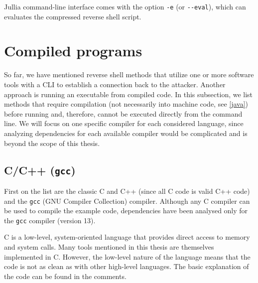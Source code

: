 
Jullia command-line interface comes with the option \texttt{-e} (or \texttt{-{}-eval}), which can evaluates the compressed reverse shell script.


\section{Compiled programs}
\label{program-compilers}

So far, we have mentioned reverse shell methods that utilize one or more software tools with a CLI to establish a connection back to the attacker. Another approach is running an executable from compiled code. In this subsection, we list methods that require compilation (not necessarily into machine code, see \cref{java}) before running and, therefore, cannot be executed directly from the command line. We will focus on one specific compiler for each considered language, since analyzing dependencies for each available compiler would be complicated and is beyond the scope of this thesis.

\subsection{C/C++ (\texttt{gcc})}


First on the list are the classic C and C++ (since all C code is valid C++ code) and the \texttt{gcc} (GNU Compiler Collection) compiler. Although any C compiler can be used to compile the example code, dependencies have been analysed only for the \texttt{gcc} compiler (version 13).

C is a low-level, system-oriented language that provides direct access to memory and system calls. Many tools mentioned in this thesis are themselves implemented in C. However, the low-level nature of the language means that the code is not as clean as with other high-level languages. The basic explanation of the code can be found in the comments.



